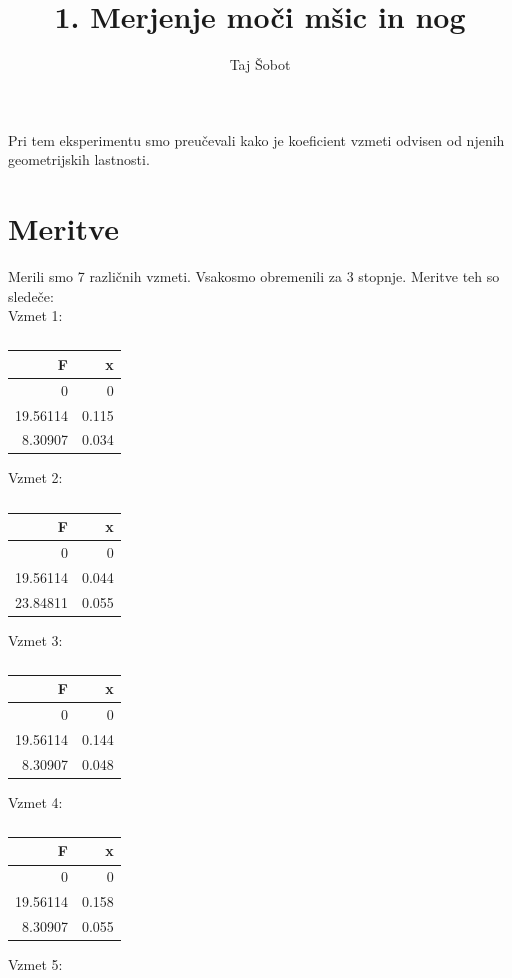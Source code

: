 \documentclass[11pt]{article}
\title{1. Merjenje moči mšic in nog}
\author{Taj Šobot}
\begin{document}
    \maketitle
    \flushleft
    Pri tem eksperimentu smo preučevali kako je koeficient vzmeti odvisen od njenih geometrijskih lastnosti.

    \section{Meritve}
    Merili smo 7 različnih vzmeti.
    Vsakosmo obremenili za 3 stopnje.
    Meritve teh so sledeče:
    \\
    Vzmet 1:
    \begin{table}[H]
        \centering
        \begin{tabular}{|r|r|}
            \hline
            \textbf{F} & \textbf{x} \\
            \hline
            0 & 0 \\
            19.56114 & 0.115 \\
            8.30907 & 0.034 \\
            \hline
        \end{tabular}
        \caption{}
        \label{tab:1}
    \end{table}
    Vzmet 2:
    \begin{table}[H]
        \centering
        \begin{tabular}{|r|r|}
            \hline
            \textbf{F} & \textbf{x} \\
            \hline
            0 & 0 \\
            19.56114 & 0.044 \\
            23.84811 & 0.055 \\
            \hline
        \end{tabular}
        \caption{}
        \label{tab:2}
    \end{table}
    Vzmet 3:
    \begin{table}[H]
        \centering
        \begin{tabular}{|r|r|}
            \hline
            \textbf{F} & \textbf{x} \\
            \hline
            0 & 0 \\
            19.56114 & 0.144 \\
            8.30907 & 0.048 \\
            \hline
        \end{tabular}
        \caption{}
        \label{tab:3}
    \end{table}
    Vzmet 4:
    \begin{table}[H]
    \centering
    \begin{tabular}{|r|r|}
        \hline
        \textbf{F} & \textbf{x} \\
        \hline
        0 & 0 \\
        19.56114 & 0.158 \\
        8.30907 & 0.055 \\
        \hline
    \end{tabular}
    \caption{}
    \label{tab:4}
    \end{table}
    Vzmet 5:
\end{document}

